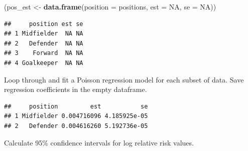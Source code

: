 \documentclass[]{book}
\makeatletter
\newenvironment{Shaded}{\begin{snugshade}}{\end{snugshade}}
\newcommand{\KeywordTok}[1]{\textcolor[rgb]{0.13,0.29,0.53}{\textbf{{#1}}}}
\newcommand{\DataTypeTok}[1]{\textcolor[rgb]{0.13,0.29,0.53}{{#1}}}
\newcommand{\DecValTok}[1]{\textcolor[rgb]{0.00,0.00,0.81}{{#1}}}
\newcommand{\FloatTok}[1]{\textcolor[rgb]{0.00,0.00,0.81}{{#1}}}
\newcommand{\StringTok}[1]{\textcolor[rgb]{0.31,0.60,0.02}{{#1}}}
\newcommand{\OtherTok}[1]{\textcolor[rgb]{0.56,0.35,0.01}{{#1}}}
\newcommand{\NormalTok}[1]{{#1}}
\newenvironment{kframe}{%
\medskip{}
\setlength{\fboxsep}{.8em}
 \def\at@end@of@kframe{}%
 \ifinner\ifhmode%
  \def\at@end@of@kframe{\end{minipage}}%
  \begin{minipage}{\columnwidth}%
 \fi\fi%
 \def\FrameCommand##1{\hskip\@totalleftmargin \hskip-\fboxsep
 \colorbox{shadecolor}{##1}\hskip-\fboxsep
     \hskip-\linewidth \hskip-\@totalleftmargin \hskip\columnwidth}%
 \MakeFramed {\advance\hsize-\width
   \@totalleftmargin\z@ \linewidth\hsize
   \@setminipage}}%
 {\par\unskip\endMakeFramed%
 \at@end@of@kframe}
\renewenvironment{Shaded}{\begin{kframe}}{\end{kframe}}
\makeatother
\begin{document}
\begin{Shaded}
\begin{Highlighting}[]
\NormalTok{(pos_est <-}\StringTok{ }\KeywordTok{data.frame}\NormalTok{(}\DataTypeTok{position =} \NormalTok{positions,}
                       \DataTypeTok{est =} \OtherTok{NA}\NormalTok{, }\DataTypeTok{se =} \OtherTok{NA}\NormalTok{))}
\end{Highlighting}
\end{Shaded}

\begin{verbatim}
##     position est se
## 1 Midfielder  NA NA
## 2   Defender  NA NA
## 3    Forward  NA NA
## 4 Goalkeeper  NA NA
\end{verbatim}

Loop through and fit a Poisson regression model for each subset of data.
Save regression coefficients in the empty dataframe.

\begin{Shaded}
\end{Shaded}

\begin{verbatim}
##     position         est           se
## 1 Midfielder 0.004716096 4.185925e-05
## 2   Defender 0.004616260 5.192736e-05
\end{verbatim}

Calculate 95\% confidence intervals for log relative risk values.

\begin{Shaded}
\end{Shaded}
\end{document}
